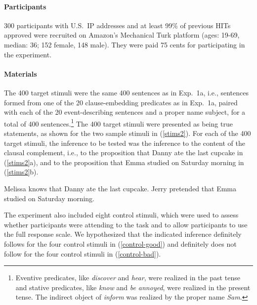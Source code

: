 \documentclass[11pt,fleqn]{article}
\newcommand{\6}{\mbox{$[\hspace*{-.6mm}[$}}
\newcommand{\9}{\mbox{$]\hspace*{-.6mm}]$}}
\begin{document}
\paragraph{Participants} 300 participants with U.S.\ IP addresses and at least 99\% of previous HITs approved were recruited on Amazon's Mechanical Turk platform (ages: 19-69, median: 36; 152 female, 148 male). They were paid 75 cents for participating in the experiment.

\paragraph{Materials} The 400 target stimuli were the same 400 sentences as in Exp.~1a, i.e., sentences formed from one of the 20 clause-embedding predicates as in Exp.~1a, paired with each of the 20 event-describing sentences and a proper name subject, for a total of 400 sentences.\footnote{Eventive predicates, like {\em discover} and {\em hear}, were realized in the past tense and stative predicates, like {\em know} and {\em be annoyed}, were realized in the present tense. The indirect object of {\em inform} was realized by the proper name {\em Sam}.} The 400 target stimuli were presented as being true statements, as shown for the two sample stimuli in (\ref{stims2}). For each of the 400 target stimuli, the inference to be tested was the inference to the content of the clausal complement, i.e.,  to the proposition that Danny ate the last cupcake in (\ref{stims2}a), and to the proposition that Emma studied on Saturday morning in (\ref{stims2}b).

\begin{exe}
\ex\label{stims2}
\begin{xlist}
 Melissa knows that Danny ate the last cupcake.
 Jerry pretended that Emma studied on Saturday morning.
\end{xlist}
\end{exe}

The experiment also included eight control stimuli, which were used to assess whether participants were attending to the task and to allow participants to use the full response scale. We hypothesized that the indicated inference definitely follows for the four control stimuli in (\ref{control-good}) and definitely does not follow for the four  control stimuli in (\ref{control-bad}).
\end{document}
